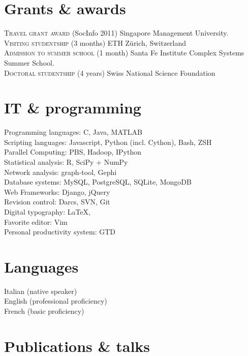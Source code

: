 \documentclass[10pt, a4paper]{article}
\newcommand{\years}[1]{\marginnote{\scriptsize #1}}
\begin{document}
\section*{Grants \& awards}
\years{2011}\textsc{Travel grant award} (SocInfo 2011) Singapore Management University.\\
%
\years{2010}\textsc{Visiting studentship} (3 months) ETH Zürich, Switzerland\\
%
\years{2008}\textsc{Admission to summer school} (1 month) Santa Fe Institute
Complex Systems Summer School.\\
%
\years{2006}\textsc{Doctoral studentship} (4 years) Swiss National Science
Foundation\\

\section*{IT \& programming}
Programming languages: C, Java, MATLAB\\
Scripting languages: Javascript, Python (incl. Cython), Bash, ZSH\\
Parallel Computing: PBS, Hadoop, IPython\\
Statistical analysis: R, SciPy + NumPy\\
Network analysis: graph-tool, Gephi\\
Database systems: MySQL, PostgreSQL, SQLite, MongoDB\\
Web Frameworks: Django, jQuery\\
Revision control: Darcs, SVN, Git\\
Digital typography: \LaTeX, \XeTeX\\
Favorite editor: Vim\\
Personal productivity system: GTD

\section*{Languages}
Italian (native speaker)\\
English (professional proficiency)\\
French (basic proficiency)

\section*{Publications \& talks}

\printbibliography[heading=subbibliography,title=Peer-reviewed publications,%
        category=peerreviewed]
\printbibliography[heading=subbibliography,title=Working papers, %
        category=workingpapers]
\printbibliography[heading=subbibliography,title=Theses,category=theses]
\end{document}
